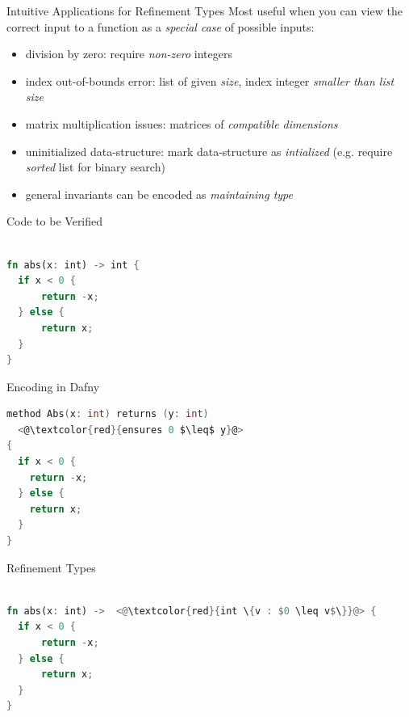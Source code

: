 \documentclass{beamer}
\begin{document}
\begin{frame}{Intuitive Applications for Refinement Types}
Most useful when you can view the correct input to a function as a \emph{special case} of possible inputs:
\begin{block}{}
\begin{itemize}
\item division by zero: require \emph{non-zero} integers
\item index out-of-bounds error: list of given \emph{size}, index integer \emph{smaller than list size}
\item matrix multiplication issues: matrices of \emph{compatible dimensions}
\item uninitialized data-structure: mark data-structure as \emph{intialized} (e.g. require \emph{sorted} list for binary search)
\item general invariants can be encoded as \emph{maintaining type}
\end{itemize}
\end{block}
\end{frame}


\begin{frame}[fragile]
\begin{block}{Code to be Verified}
\begin{lstlisting}[language=Rust]

fn abs(x: int) -> int { 
  if x < 0 { 
      return -x;
  } else { 
      return x;
  }
} 
\end{lstlisting}
\end{block}
\end{frame}




\begin{frame}[fragile]
\begin{block}{Encoding in Dafny}
\begin{lstlisting}[language=C]
method Abs(x: int) returns (y: int)
  <@\textcolor{red}{ensures 0 $\leq$ y}@>
{
  if x < 0 {
    return -x;
  } else {
    return x;
  }
}
\end{lstlisting}
\end{block}
\end{frame}




\begin{frame}[fragile]
\begin{block}{Refinement Types}
\begin{lstlisting}[language=Rust]

fn abs(x: int) ->  <@\textcolor{red}{int \{v : $0 \leq v$\}}@> { 
  if x < 0 { 
      return -x;
  } else { 
      return x;
  }
} 
\end{lstlisting}
\end{block}
\end{frame}
\end{document}
